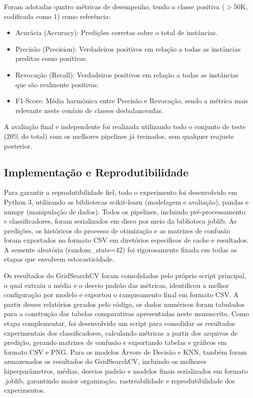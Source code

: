 Foram adotadas quatro métricas de desempenho, tendo a classe positiva ($>$50K, codificada como 1) como referência:
\begin{itemize}
    \item Acurácia (Accuracy): Predições corretas sobre o total de instâncias.
    \item Precisão (Precision): Verdadeiros positivos em relação a todas as instâncias preditas como positivas.
    \item Revocação (Recall): Verdadeiros positivos em relação a todas as instâncias que são realmente positivas.
    \item F1-Score: Média harmônica entre Precisão e Revocação, sendo a métrica mais relevante neste cenário de classes desbalanceadas.
\end{itemize}
A avaliação final e independente foi realizada utilizando todo o conjunto de teste (20\% do total) com os melhores pipelines já treinados, sem qualquer reajuste posterior.

\subsection{Implementação e Reprodutibilidade}
Para garantir a reprodutibilidade fiel, todo o experimento foi desenvolvido em Python 3, utilizando as bibliotecas scikit-learn (modelagem e avaliação), pandas e numpy (manipulação de dados). Todos os pipelines, incluindo pré-processamento e classificadores, foram serializados em disco por meio da biblioteca joblib. As predições, os históricos do processo de otimização e as matrizes de confusão foram exportados no formato CSV em diretórios específicos de cache e resultados. A semente aleatória (random\_state=42) foi rigorosamente fixada em todas as etapas que envolvem estocasticidade.

Os resultados do GridSearchCV foram consolidados pelo próprio script principal, o qual extraiu a média e o desvio padrão das métricas, identificou a melhor configuração por modelo e exportou o ranqueamento final em formato CSV. A partir desses relatórios gerados pelo código, os dados numéricos foram tabulados para a construção das tabelas comparativas apresentadas neste manuscrito.
Como etapa complementar, foi desenvolvido um script para consolidar os resultados experimentais dos classificadores, calculando métricas a partir dos arquivos de predição, gerando matrizes de confusão e exportando tabelas e gráficos em formato CSV e PNG. Para os modelos Árvore de Decisão e KNN, também foram armazenados os resultados do GridSearchCV, incluindo os melhores hiperparâmetros, médias, desvios padrão e modelos finais serializados em formato .joblib, garantindo maior organização, rastreabilidade e reprodutibilidade dos experimentos.